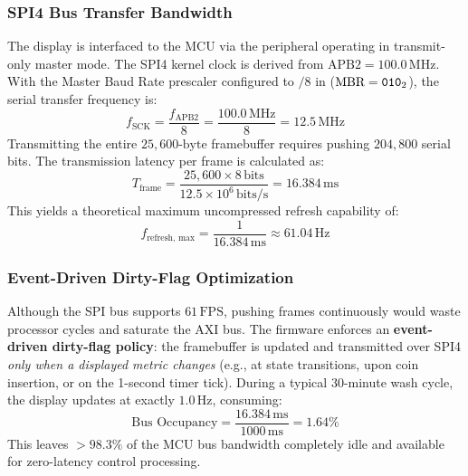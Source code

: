 \subsubsection{SPI4 Bus Transfer Bandwidth}
The display is interfaced to the MCU via the  peripheral operating in transmit-only master mode.
The SPI4 kernel clock is derived from $\text{APB2} = 100.0\,\text{MHz}$. With the Master Baud Rate prescaler
configured to $/8$ in  ($\text{MBR} = \code{010}_2$), the serial transfer frequency is:
\begin{equation}
  f_{\text{SCK}} = \frac{f_{\text{APB2}}}{8} = \frac{100.0\,\text{MHz}}{8} = 12.5\,\text{MHz}
\end{equation}
Transmitting the entire $25{,}600\text{-byte}$ framebuffer requires pushing $204{,}800$ serial bits.
The transmission latency per frame is calculated as:
\begin{equation}
  T_{\text{frame}} = \frac{25{,}600 \times 8\,\text{bits}}{12.5 \times 10^6\,\text{bits/s}} = 16.384\,\text{ms}
  \label{eq:spi-latency}
\end{equation}
This yields a theoretical maximum uncompressed refresh capability of:
\begin{equation}
  f_{\text{refresh, max}} = \frac{1}{16.384\,\text{ms}} \approx 61.04\,\text{Hz}
\end{equation}

\subsubsection{Event-Driven Dirty-Flag Optimization}
Although the SPI bus supports $61\,\text{FPS}$, pushing frames continuously would waste processor cycles
and saturate the AXI bus. The firmware enforces an \textbf{event-driven dirty-flag policy}: the framebuffer
is updated and transmitted over SPI4 \emph{only when a displayed metric changes} (e.g., at state transitions,
upon coin insertion, or on the 1-second timer tick). During a typical 30-minute wash cycle, the display
updates at exactly $1.0\,\text{Hz}$, consuming:
\begin{equation}
  \text{Bus Occupancy} = \frac{16.384\,\text{ms}}{1000\,\text{ms}} = 1.64\%
\end{equation}
This leaves $>98.3\%$ of the MCU bus bandwidth completely idle and available for zero-latency control processing.

